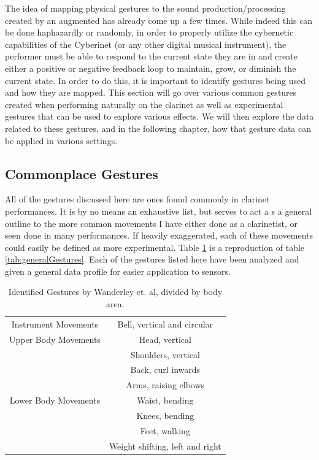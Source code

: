 The idea of mapping physical gestures to the sound production/processing created by an augmented has already come up a few times. While indeed this can be done haphazardly or randomly, in order to properly utilize the cybernetic capabilities of the Cyberinet (or any other digital musical instrument), the performer must be able to respond to the current state they are in and create either a positive or negative feedback loop to maintain, grow, or diminish the current state. In order to do this, it is important to identify gestures being used and how they are mapped. This section will go over various common gestures created when performing naturally on the clarinet as well as experimental gestures that can be used to explore various effects. We will then explore the data related to these gestures, and in the following chapter, how that gesture data can be applied in various settings.

\subsection{Commonplace Gestures}
All of the gestures discussed here are ones found commonly in clarinet performances. It is by no means an exhaustive list, but serves to act a s a general outline to the more common movements I have either done as a clarinetist, or seen done in many performances. If heavily exaggerated, each of these movements could easily be defined as more experimental. Table \ref{tab:generalGestures2} is a reproduction of table \ref{tab:generalGestures}. Each of the gestures listed here have been analyzed and given a general data profile for easier application to sensors.


\begin{table}[]
    \centering
    \begin{tabular}{c|c}
       Instrument Movements  & Bell, vertical and circular \\
        Upper Body Movements & Head, vertical \\
        & Shoulders, vertical \\
        & Back, curl inwards \\
        & Arms, raising elbows \\
        Lower Body Movements & Waist, bending \\
        & Knees, bending \\
        & Feet, walking \\
        & Weight shifting, left and right
    \end{tabular}
    \caption{Identified Gestures by Wanderley et. al\cite{wanderleyClarinetGesture2005}, divided by body area.}
    \label{tab:generalGestures2}
\end{table}

